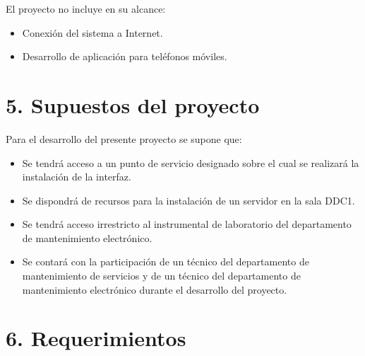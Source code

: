 \documentclass[
11pt%
]{charter}
\begin{document}
El proyecto no incluye en su alcance:
\begin{itemize}
	\item Conexión del sistema a Internet.
	\item Desarrollo de aplicación para teléfonos móviles.
\end{itemize}




\section{5. Supuestos del proyecto}
\label{sec:supuestos}


Para el desarrollo del presente proyecto se supone que:

\begin{itemize}
	\item Se tendrá acceso a un punto de servicio designado sobre el cual se realizará la instalación de la interfaz.
	\item Se dispondrá de recursos para la instalación de un servidor en la sala DDC1.
	\item Se tendrá acceso irrestricto al instrumental de laboratorio del departamento de mantenimiento electrónico.
	\item Se contará con la participación de un técnico del departamento de mantenimiento de servicios y de un técnico del departamento de mantenimiento electrónico durante el desarrollo del proyecto.
\end{itemize}



\section{6. Requerimientos}
\label{sec:requerimientos}
\end{document}
